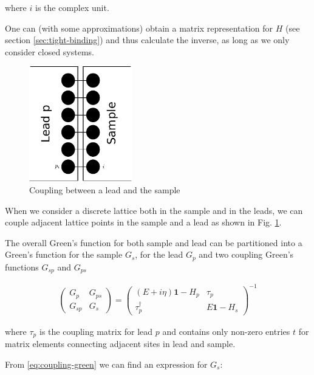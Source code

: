 \documentclass[11pt,twoside]{book}
\begin{document}
where $i$ is the complex unit.

One can (with some approximations) obtain a matrix representation for $H$
(see section \ref{sec:tight-binding}) and thus calculate the inverse, as
long as we only consider closed systems.

\begin{figure}
    \begin{center}
        \includegraphics[height=5cm]{coupling-sample-lead}
    \end{center}
    \caption{Coupling between a lead and the sample}
    \label{fig:coupling-sample-lead}
\end{figure}

When we consider a discrete lattice both in the sample and in the leads, we
can couple adjacent lattice points in the sample and a lead as shown in Fig.
\ref{fig:coupling-sample-lead}.

The overall Green's function for both sample and lead can be partitioned into
a Green's function for the sample $G_s$, for the lead $G_p$ and two coupling
Green's functions $G_{sp}$ and  $G_{ps}$

\begin{align}
\left(
    \begin{array}{ll}
        G_p    & G_{ps}\\
        G_{sp} & G_s
    \end{array}
\right)
=
\left(
    \begin{array}{ll}
        (E + i\eta)\mathbf{1} - H_p   & \tau_p\\
        \tau_p^\dagger                & E\mathbf{1} - H_s
    \end{array}
\right)^{-1}
\label{eq:coupling-green}
\end{align}

where $\tau_p$ is the coupling matrix for lead $p$ and contains only non-zero
entries $t$ for matrix elements connecting adjacent sites in lead and sample.

From \ref{eq:coupling-green} we can find an expression for $G_s$:
\end{document}

